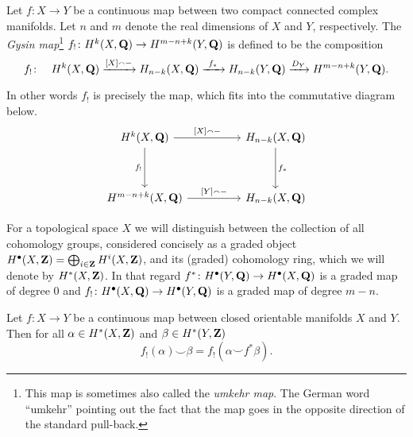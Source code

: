 \begin{definition}
    \label{Definition of umkehr map}
    Let $f \colon X \to Y$ be a continuous map between two compact connected complex manifolds. Let $n$ and $m$ denote the real dimensions of $X$ and $Y$, respectively.
    The \emph{Gysin map}\footnote{This map is sometimes also called the \emph{umkehr map}. The German word ``umkehr'' pointing out the fact that the map goes in the opposite direction of the standard pull-back.} $f_! \colon H^{k}(X, \mathbf Q) \to H^{m-n+k}(Y, \mathbf Q)$ is defined to be the composition
    \[
        f_! \colon \quad H^{k}(X, \mathbf Q) \xrightarrow{[X] \smallfrown -} H_{n-k}(X, \mathbf Q) \xrightarrow{\ f_* \ } H_{n-k}(Y, \mathbf Q) \xrightarrow{D_Y} H^{m-n+k}(Y, \mathbf Q).
    \]
\end{definition}

\begin{remark}
    In other words $f_!$ is precisely the map, which fits into the commutative diagram below.
    \[\begin{tikzcd}
        \cohom{k}{X}{\Q} && H_{n-k}(X, \Q) \\
        \\
        \cohom{m-n+k}{X}{\Q} && H_{n-k}(X, \Q)
        \arrow["{[X] \smallfrown -}", from=1-1, to=1-3]
        \arrow["{f_!}"', from=1-1, to=3-1]
        \arrow["{f_*}", from=1-3, to=3-3]
        \arrow["{[Y] \smallfrown -}", from=3-1, to=3-3]
    \end{tikzcd}\]
\end{remark}

\begin{remark}
    For a topological space $X$ we will distinguish between the collection of all cohomology groups, considered concisely as a graded object $H^{\bullet}(X, \mathbf Z) = \bigoplus_{i\in \mathbf Z} H^{i}(X, \mathbf Z)$, and its (graded) cohomology ring, which we will denote by $H^{*}(X, \mathbf Z)$. In that regard $f^* \colon H^{\bullet}(Y, \mathbf Q) \to H^{\bullet}(X, \mathbf Q)$ is a graded map of degree $0$ and $f_! \colon H^{\bullet}(X, \mathbf Q) \to H^{\bullet}(Y, \mathbf Q)$ is a graded map of degree $m - n$.
\end{remark}

\begin{proposition}
    \label{cohomological projection formula}
    Let $f \colon X \to Y$ be a continuous map between closed orientable manifolds $X$ and $Y$. Then for all $\alpha \in H^{*}(X, \mathbf Z)$ and $\beta \in H^{*}(Y, \mathbf Z)$
    \begin{equation}
        \label{eq: cohomological projection formula}
        f_!(\alpha) \smallsmile \beta = f_!(\alpha \smallsmile f^*\beta).
    \end{equation}
\end{proposition}

